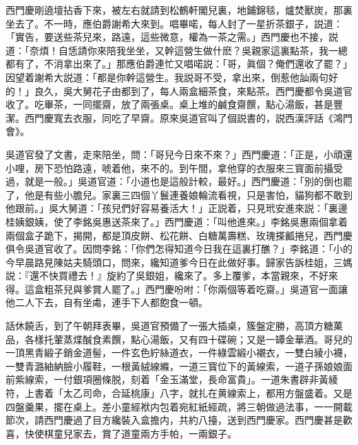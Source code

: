 西門慶剛遶壇拈香下來，被左右就請到松鶴軒閣兒裏，地鋪錦毯，爐焚獸炭，那裏坐去了。不一時，應伯爵謝希大來到。唱畢喏，每人封了一星折茶銀子，説道：「實告，要送些茶兒來，路遠，這些微意，權為一茶之需。」西門慶也不接，説道：「奈煩！自恁請你來陪我坐坐，又幹這營生做什麽？吳親家這裏點茶，我一總都有了，不消拿出來了。」那應伯爵連忙又唱喏説：「哥，眞個？俺們還收了罷？」因望着謝希大説道：「都是你幹這營生。我説哥不受，拿出來，倒惹他訕兩句好的！」良久，吳大舅花子由都到了，每人兩盒細茶食，來點茶。西門慶都令吳道官收了。吃畢茶，一同擺齋，放了兩張桌。桌上堆的鹹食齋饌，點心湯飯，甚是豐潔。西門慶寬去衣服，同吃了早齋。原來吳道官叫了個説書的，説西漢評話《鴻門會》。

吳道官發了文書，走來陪坐，問：「哥兒今日來不來？」西門慶道：「正是，小頑還小哩，房下恐怕路遠，唬着他，來不的。到午間，拿他穿的衣服來三寳面前攝受過，就是一般。」吳道官道：「小道也是這般計較，最好。」西門慶道：「別的倒也罷了，他是有些小膽兒。家裏三四個丫鬟連養娘輪流看視，只是害怕，貓狗都不敢到他跟前。」吳大舅道：「孩兒們好容易養活大！」正説着，只見玳安進來説：「裏邊桂姨銀姨，使了李銘吳惠送茶來了。」西門慶道：「叫他進來。」李銘吳惠兩個拿着兩個盒子跪下，揭開，都是頂皮餅、松花餅、白糖萬壽糕、玫瑰搽瓤捲兒，西門慶俱令吳道官收了。因問李銘：「你們怎得知道今日我在這裏打醮？」李銘道：「小的今早晨路見陳姑夫騎頭口，問來，纔知道爹今日在此做好事。歸家告訴桂姐，三媽説：『還不快買禮去！』旋約了吳銀姐，纔來了。多上覆爹，本當親來，不好來得。這盒粗茶兒與爹賞人罷了。」西門慶吩咐：「你兩個等着吃齋。」吳道官一面讓他二人下去，自有坐䖏，連手下人都飽食一頓。

話休饒舌，到了午朝拜表畢，吳道官預備了一張大插桌，簇盤定勝，高頂方糖菓品，各樣托葷蒸煠醎食素饌，點心湯飯，又有四十碟碗；又是一罈金華酒。哥兒的一頂黑青緞子銷金道髻，一件玄色紵絲道衣，一件綠雲緞小襯衣，一雙白綾小襪，一雙青潞紬納臉小履鞋，一根黃絨線縧，一道三寳位下的黃線索，一道子孫娘娘面前紫線索，一付銀項圈條脱，刻着「金玉滿堂，長命富貴」。一道朱書辟非黃綾符，上書着「太乙司命，合延桃康」八字，就扎在黄線索上，都用方盤盛着。又是四盤羹果，擺在桌上。差小童經袱内包着宛紅紙經疏，將三朝做過法事，一一開載節次，請西門慶過了目方纔裝入盒擔内，共約八擡，送到西門慶家。西門慶甚是歡喜，快使棋童兒家去，賞了道童兩方手帕，一兩銀子。

